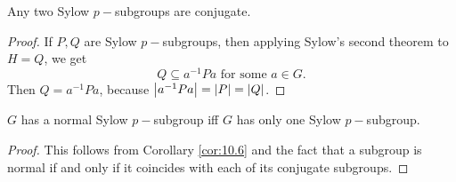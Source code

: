 \documentclass[../main-sheet.tex]{subfiles}
\begin{document}
\begin{cor} 
Any two Sylow \(p-\)subgroups are conjugate.
\end{cor}
\begin{proof}
    If \(P , Q\) are Sylow \(p-\)subgroups, then applying Sylow's second theorem to \(H = Q \),
    we get
    \[Q \subseteq a^{-1} Pa\text{ for some  } a \in G .\]
    Then \(Q = a^{-1}P a\), because \( \left\vert a^{-1}Pa\right\vert =\left\vert P\right\vert= \left\vert Q\right\vert\).
\end{proof}
\begin{cor}\label{cor:10.6}
\(G\) has a normal Sylow \(p-\)subgroup iff \(G\) has only one Sylow \(p-\)subgroup.
\end{cor}
\begin{proof}
    This follows from Corollary \ref{cor:10.6} and the fact that a subgroup is normal if and
    only if it coincides with each of its conjugate subgroups.
\end{proof}
\end{document}
